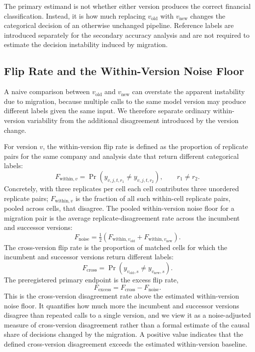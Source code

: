 \documentclass{ieeeaccess}
\begin{document}
The primary estimand is not whether either version produces the correct financial classification. Instead, it is how much replacing $v_{\mathrm{old}}$ with $v_{\mathrm{new}}$ changes the categorical decision of an otherwise unchanged pipeline. Reference labels are introduced separately for the secondary accuracy analysis and are not required to estimate the decision instability induced by migration.

\subsection{Flip Rate and the Within-Version Noise Floor}
\label{subsec:noisefloor}
A naive comparison between $v_{\mathrm{old}}$ and $v_{\mathrm{new}}$ can overstate the apparent instability due to migration, because multiple calls to the same model version may produce different labels given the same input. We therefore separate ordinary within-version variability from the additional disagreement introduced by the version change.

For version $v$, the within-version flip rate is defined as the proportion of replicate pairs for the same company and analysis date that return different categorical labels:
\begin{equation}
F_{\mathrm{within},v} = \Pr\!\left( y_{v,j,t,r_1}\neq y_{v,j,t,r_2} \right), \qquad r_1\neq r_2.
\end{equation}
Concretely, with three replicates per cell each cell contributes three unordered replicate pairs; $F_{\mathrm{within},v}$ is the fraction of all such within-cell replicate pairs, pooled across cells, that disagree. The pooled within-version noise floor for a migration pair is the average replicate-disagreement rate across the incumbent and successor versions:
\begin{equation}
F_{\mathrm{noise}} = \tfrac{1}{2} \left( F_{\mathrm{within},v_{\mathrm{old}}} + F_{\mathrm{within},v_{\mathrm{new}}} \right).
\end{equation}
The cross-version flip rate is the proportion of matched cells for which the incumbent and successor versions return different labels:
\begin{equation}
F_{\mathrm{cross}} = \Pr\!\left( y_{v_{\mathrm{old}},s} \neq y_{v_{\mathrm{new}},s} \right).
\end{equation}
The preregistered primary endpoint is the excess flip rate,
\begin{equation}
F_{\mathrm{excess}} = F_{\mathrm{cross}} - F_{\mathrm{noise}}.
\end{equation}
This is the cross-version disagreement rate above the estimated within-version noise floor. It quantifies how much more the incumbent and successor versions disagree than repeated calls to a single version, and we view it as a noise-adjusted measure of cross-version disagreement rather than a formal estimate of the causal share of decisions changed by the migration. A positive value indicates that the defined cross-version disagreement exceeds the estimated within-version baseline.
\end{document}
